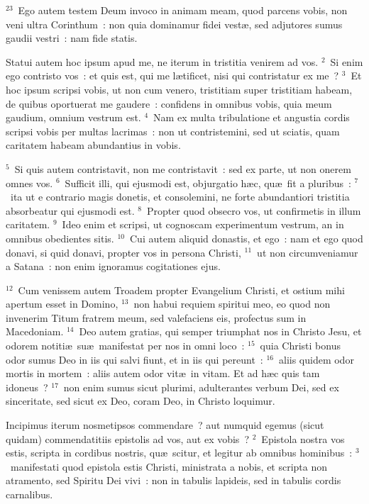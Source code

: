 ${}^{23}$~Ego autem testem Deum invoco in animam meam, quod parcens vobis, non veni ultra Corinthum~: non quia dominamur fidei vest\ae , sed adjutores sumus gaudii vestri~: nam fide statis.

\lettrine[lines=3,image=true,loversize=0.05,lraise=-0.03]{S}{}tatui autem hoc ipsum apud me, ne iterum in tristitia venirem ad vos.
${}^{2}$~Si enim ego contristo vos~: et quis est, qui me l\ae tificet, nisi qui contristatur ex me~?
${}^{3}$~Et hoc ipsum scripsi vobis, ut non cum venero, tristitiam super tristitiam habeam, de quibus oportuerat me gaudere~: confidens in omnibus vobis, quia meum gaudium, omnium vestrum est.
${}^{4}$~Nam ex multa tribulatione et angustia cordis scripsi vobis per multas lacrimas~: non ut contristemini, sed ut sciatis, quam caritatem habeam abundantius in vobis.


${}^{5}$~Si quis autem contristavit, non me contristavit~: sed ex parte, ut non onerem omnes vos.
${}^{6}$~Sufficit illi, qui ejusmodi est, objurgatio h\ae c, qu\ae\ fit a pluribus~:
${}^{7}$~ita ut e contrario magis donetis, et consolemini, ne forte abundantiori tristitia absorbeatur qui ejusmodi est.
${}^{8}$~Propter quod obsecro vos, ut confirmetis in illum caritatem.
${}^{9}$~Ideo enim et scripsi, ut cognoscam experimentum vestrum, an in omnibus obedientes sitis.
${}^{10}$~Cui autem aliquid donastis, et ego~: nam et ego quod donavi, si quid donavi, propter vos in persona Christi,
${}^{11}$~ut non circumveniamur a Satana~: non enim ignoramus cogitationes ejus.


${}^{12}$~Cum venissem autem Troadem propter Evangelium Christi, et ostium mihi apertum esset in Domino,
${}^{13}$~non habui requiem spiritui meo, eo quod non invenerim Titum fratrem meum, sed valefaciens eis, profectus sum in Macedoniam.
${}^{14}$~Deo autem gratias, qui semper triumphat nos in Christo Jesu, et odorem notiti\ae\ su\ae\ manifestat per nos in omni loco~:
${}^{15}$~quia Christi bonus odor sumus Deo in iis qui salvi fiunt, et in iis qui pereunt~:
${}^{16}$~aliis quidem odor mortis in mortem~: aliis autem odor vit\ae\ in vitam. Et ad h\ae c quis tam idoneus~?
${}^{17}$~non enim sumus sicut plurimi, adulterantes verbum Dei, sed ex sinceritate, sed sicut ex Deo, coram Deo, in Christo loquimur.

\lettrine[lines=3,image=true,loversize=0.05,lraise=-0.03]{I}{}ncipimus iterum nosmetipsos commendare~? aut numquid egemus (sicut quidam) commendatitiis epistolis ad vos, aut ex vobis~?
${}^{2}$~Epistola nostra vos estis, scripta in cordibus nostris, qu\ae\ scitur, et legitur ab omnibus hominibus~:
${}^{3}$~manifestati quod epistola estis Christi, ministrata a nobis, et scripta non atramento, sed Spiritu Dei vivi~: non in tabulis lapideis, sed in tabulis cordis carnalibus.


